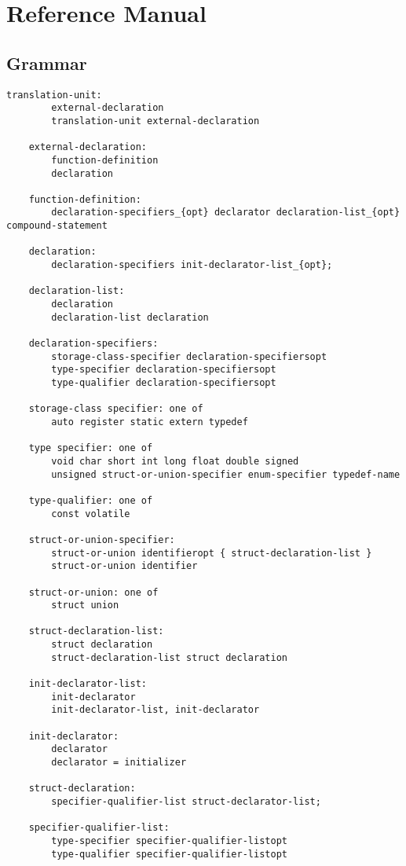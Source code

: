 
\chapter{Reference Manual}

\setcounter{section}{12}
\section{Grammar}
\begin{lstlisting}[basicstyle=\ttfamily\normalsize\itshape, keywordstyle=\color{black}, stringstyle=\color{black}]
	translation-unit:
		external-declaration
		translation-unit external-declaration

	external-declaration:
		function-definition
		declaration

	function-definition:
		declaration-specifiers_{opt} declarator declaration-list_{opt} compound-statement

	declaration:
		declaration-specifiers init-declarator-list_{opt};

	declaration-list:
		declaration
		declaration-list declaration

	declaration-specifiers:
		storage-class-specifier declaration-specifiersopt
		type-specifier declaration-specifiersopt
		type-qualifier declaration-specifiersopt

	storage-class specifier: one of
		auto register static extern typedef

	type specifier: one of
		void char short int long float double signed
		unsigned struct-or-union-specifier enum-specifier typedef-name

	type-qualifier: one of
		const volatile

	struct-or-union-specifier:
		struct-or-union identifieropt { struct-declaration-list }
		struct-or-union identifier

	struct-or-union: one of
		struct union

	struct-declaration-list:
		struct declaration
		struct-declaration-list struct declaration

	init-declarator-list:
		init-declarator
		init-declarator-list, init-declarator

	init-declarator:
		declarator
		declarator = initializer

	struct-declaration:
		specifier-qualifier-list struct-declarator-list;

	specifier-qualifier-list:
		type-specifier specifier-qualifier-listopt
		type-qualifier specifier-qualifier-listopt


\end{lstlisting}

